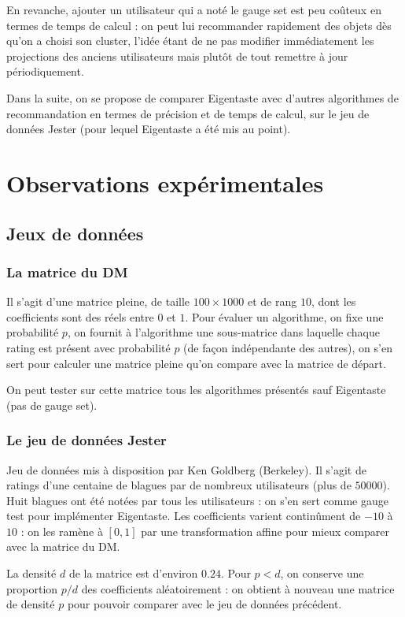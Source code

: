 \documentclass[11pt, openany, a4paper]{article}
\begin{document}
		En revanche, ajouter un utilisateur qui a noté le gauge set est peu coûteux en termes de temps de calcul : on peut lui recommander rapidement des objets dès qu'on a choisi son cluster, l'idée étant de ne pas modifier immédiatement les projections des anciens utilisateurs mais plutôt de tout remettre à jour périodiquement.
		
		Dans la suite, on se propose de comparer Eigentaste avec d'autres algorithmes de recommandation en termes de précision et de temps de calcul, sur le jeu de données Jester (pour lequel Eigentaste a été mis au point).
		
		
		
		
\section{Observations expérimentales}
	\subsection{Jeux de données}
	\subsubsection{La matrice du DM}
		
		Il s'agit d'une matrice pleine, de taille $100 \times 1000$ et de rang $10$, dont les coefficients sont des réels entre $0$ et $1$. Pour évaluer un algorithme, on fixe une probabilité $p$, on fournit à l'algorithme une sous-matrice dans laquelle chaque rating est présent avec probabilité $p$ (de façon indépendante des autres), on s'en sert pour calculer une matrice pleine qu'on compare avec la matrice de départ.
		
		On peut tester sur cette matrice tous les algorithmes présentés sauf Eigentaste (pas de gauge set).
		
	\subsubsection{Le jeu de données Jester}
		Jeu de données mis à disposition par Ken Goldberg (Berkeley). Il s'agit de ratings d'une centaine de blagues par de nombreux utilisateurs (plus de $50 000$). Huit blagues ont été notées par tous les utilisateurs : on s'en sert comme gauge test pour implémenter Eigentaste. Les coefficients varient continûment de $-10$ à $10$ : on les ramène à $[0,1]$ par une transformation affine pour mieux comparer avec la matrice du DM.
		
		La densité $d$ de la matrice est d'environ $0.24$. Pour $p<d$, on conserve une proportion $p/d$ des coefficients aléatoirement : on obtient à nouveau une matrice de densité $p$ pour pouvoir comparer avec le jeu de données précédent.
		
\end{document}
